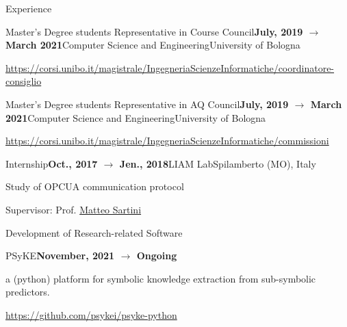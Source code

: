 \documentclass{resume} %
\begin{document}
\begin{rSection}{Experience}
        \begin{rSubsection}{Master's Degree students Representative in Course Council}{\textbf{July, 2019 $\rightarrow$ March 2021}}{Computer Science and Engineering}{University of Bologna}
            \item \url{https://corsi.unibo.it/magistrale/IngegneriaScienzeInformatiche/coordinatore-consiglio}
        \end{rSubsection}
        
        \begin{rSubsection}{Master's Degree students Representative in AQ Council}{\textbf{July, 2019 $\rightarrow$ March 2021}}{Computer Science and Engineering}{University of Bologna}
            \item \url{https://corsi.unibo.it/magistrale/IngegneriaScienzeInformatiche/commissioni}
        \end{rSubsection}
        
        \begin{rSubsection}{Internship}{\textbf{Oct., 2017 $\rightarrow$ Jen., 2018}}{LIAM Lab}{Spilamberto (MO), Italy}
            \item Study of OPCUA communication protocol
            \item Supervisor: Prof. \href{mailto:matteo.sartini@unibo.it}{Matteo Sartini} 
        \end{rSubsection}
        
    \end{rSection}
    
    
    \begin{rSection}{Development of Research-related Software}
        
        \begin{rSubsection}{PSyKE}{\textbf{November, 2021 $\rightarrow$ Ongoing}}{}{}
            \item a (python) platform for symbolic knowledge extraction from sub-symbolic predictors.
            \item \url{https://github.com/psykei/psyke-python}
        \end{rSubsection}
        
    \end{rSection}
    
    
\end{document}
